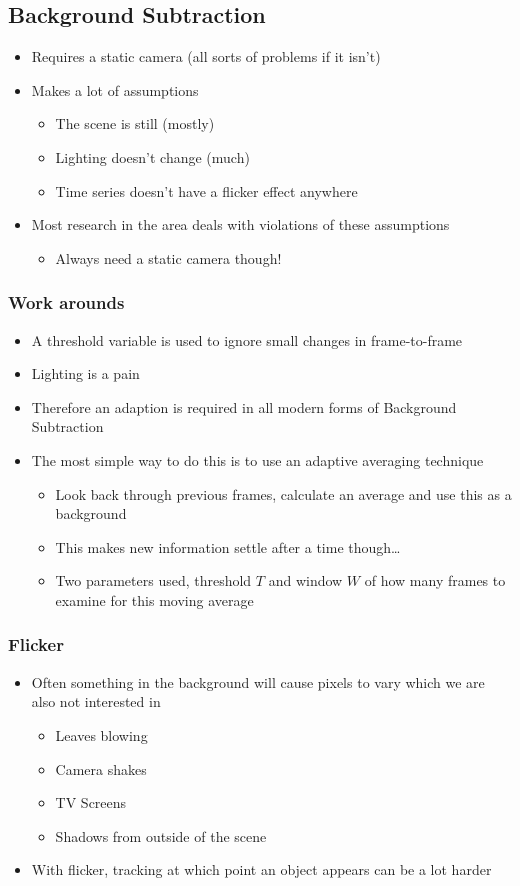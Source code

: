 \documentclass[a4paper]{article}
\begin{document}
\subsection{Background Subtraction}
\label{sec-4-1}
\begin{itemize}
\item Requires a static camera (all sorts of problems if it isn't)
\item Makes a lot of assumptions
\begin{itemize}
\item The scene is still (mostly)
\item Lighting doesn't change (much)
\item Time series doesn't have a flicker effect anywhere
\end{itemize}
\item Most research in the area deals with violations of these assumptions
\begin{itemize}
\item Always need a static camera though!
\end{itemize}
\end{itemize}
\subsubsection{Work arounds}
\label{sec-4-1-1}
\begin{itemize}
\item A threshold variable is used to ignore small changes in frame-to-frame
\item Lighting is a pain
\item Therefore an adaption is required in all modern forms of Background Subtraction
\item The most simple way to do this is to use an adaptive averaging technique
\begin{itemize}
\item Look back through previous frames, calculate an average and use this as a background
\item This makes new information settle after a time though\ldots{}
\item Two parameters used, threshold $T$ and window $W$ of how many frames to examine for this moving average
\end{itemize}
\end{itemize}
\subsubsection{Flicker}
\label{sec-4-1-2}
\begin{itemize}
\item Often something in the background will cause pixels to vary which we are also not interested in
\begin{itemize}
\item Leaves blowing
\item Camera shakes
\item TV Screens
\item Shadows from outside of the scene
\end{itemize}
\item With flicker, tracking at which point an object appears can be a lot harder
\end{itemize}
\end{document}
